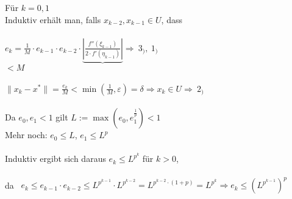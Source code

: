 \documentclass[10pt,a4paper]{article}
\begin{document}
Für $k=0,1$ \checkmark
\\Induktiv erhält man, falls $x_{k-2},x_{k-1}\in U$, dass\\
\\$e_k=\frac{1}{M}\cdot e_{k-1}\cdot e_{k-2}\cdot \underbrace{\left|\frac{f''(\xi_{k-1})}{2\cdot f'(\eta_{k-1})}\right|}\Rightarrow \ 3_), \ 1_)$
\\\hspace*{40mm}$<M$\\
\\$\|x_k-x^*\|=\frac{e_k}{M}<\min(\frac{1}{M},\varepsilon)=\delta\Rightarrow x_k\in U\Rightarrow \ 2_)$\\
\\Da $e_0,e_1<1$ gilt $L:=\max(e_0,e_1^\frac{1}{p})<1$
\\Mehr noch: $e_0\leq L$, $e_1\leq L^p$\\
\\Induktiv ergibt sich daraus $e_k\leq L^{p^k}$ für $k>0$,\\
\\da \ $e_k\leq e_{k-1}\cdot e_{k-2}\leq L^{p^{k-1}}\cdot L^{p^{k-2}}=L^{p^{k-2}\cdot (1+p)}=L^{p^k}\Rightarrow e_k\leq (L^{p^{k-1}})^p$
\end{document}
